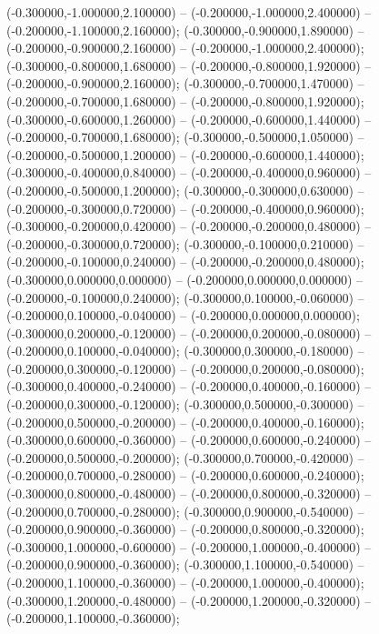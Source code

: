  (-0.300000,-1.000000,2.100000) -- (-0.200000,-1.000000,2.400000) -- (-0.200000,-1.100000,2.160000);
 (-0.300000,-0.900000,1.890000) -- (-0.200000,-0.900000,2.160000) -- (-0.200000,-1.000000,2.400000);
 (-0.300000,-0.800000,1.680000) -- (-0.200000,-0.800000,1.920000) -- (-0.200000,-0.900000,2.160000);
 (-0.300000,-0.700000,1.470000) -- (-0.200000,-0.700000,1.680000) -- (-0.200000,-0.800000,1.920000);
 (-0.300000,-0.600000,1.260000) -- (-0.200000,-0.600000,1.440000) -- (-0.200000,-0.700000,1.680000);
 (-0.300000,-0.500000,1.050000) -- (-0.200000,-0.500000,1.200000) -- (-0.200000,-0.600000,1.440000);
 (-0.300000,-0.400000,0.840000) -- (-0.200000,-0.400000,0.960000) -- (-0.200000,-0.500000,1.200000);
 (-0.300000,-0.300000,0.630000) -- (-0.200000,-0.300000,0.720000) -- (-0.200000,-0.400000,0.960000);
 (-0.300000,-0.200000,0.420000) -- (-0.200000,-0.200000,0.480000) -- (-0.200000,-0.300000,0.720000);
 (-0.300000,-0.100000,0.210000) -- (-0.200000,-0.100000,0.240000) -- (-0.200000,-0.200000,0.480000);
 (-0.300000,0.000000,0.000000) -- (-0.200000,0.000000,0.000000) -- (-0.200000,-0.100000,0.240000);
 (-0.300000,0.100000,-0.060000) -- (-0.200000,0.100000,-0.040000) -- (-0.200000,0.000000,0.000000);
 (-0.300000,0.200000,-0.120000) -- (-0.200000,0.200000,-0.080000) -- (-0.200000,0.100000,-0.040000);
 (-0.300000,0.300000,-0.180000) -- (-0.200000,0.300000,-0.120000) -- (-0.200000,0.200000,-0.080000);
 (-0.300000,0.400000,-0.240000) -- (-0.200000,0.400000,-0.160000) -- (-0.200000,0.300000,-0.120000);
 (-0.300000,0.500000,-0.300000) -- (-0.200000,0.500000,-0.200000) -- (-0.200000,0.400000,-0.160000);
 (-0.300000,0.600000,-0.360000) -- (-0.200000,0.600000,-0.240000) -- (-0.200000,0.500000,-0.200000);
 (-0.300000,0.700000,-0.420000) -- (-0.200000,0.700000,-0.280000) -- (-0.200000,0.600000,-0.240000);
 (-0.300000,0.800000,-0.480000) -- (-0.200000,0.800000,-0.320000) -- (-0.200000,0.700000,-0.280000);
 (-0.300000,0.900000,-0.540000) -- (-0.200000,0.900000,-0.360000) -- (-0.200000,0.800000,-0.320000);
 (-0.300000,1.000000,-0.600000) -- (-0.200000,1.000000,-0.400000) -- (-0.200000,0.900000,-0.360000);
 (-0.300000,1.100000,-0.540000) -- (-0.200000,1.100000,-0.360000) -- (-0.200000,1.000000,-0.400000);
 (-0.300000,1.200000,-0.480000) -- (-0.200000,1.200000,-0.320000) -- (-0.200000,1.100000,-0.360000);
